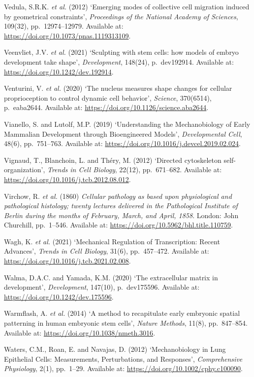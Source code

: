 \documentclass[
]{article}
\begin{document}
Vedula, S.R.K. \emph{et al.} (2012) `Emerging modes of collective cell
migration induced by geometrical constraints', \emph{Proceedings of the
National Academy of Sciences}, 109(32), pp.~12974--12979. Available at:
\url{https://doi.org/10.1073/pnas.1119313109}.

Veenvliet, J.V. \emph{et al.} (2021) `Sculpting with stem cells: how
models of embryo development take shape', \emph{Development}, 148(24),
p.~dev192914. Available at: \url{https://doi.org/10.1242/dev.192914}.

Venturini, V. \emph{et al.} (2020) `The nucleus measures shape changes
for cellular proprioception to control dynamic cell behavior',
\emph{Science}, 370(6514), p.~eaba2644. Available at:
\url{https://doi.org/10.1126/science.aba2644}.

Vianello, S. and Lutolf, M.P. (2019) `Understanding the Mechanobiology
of Early Mammalian Development through Bioengineered Models',
\emph{Developmental Cell}, 48(6), pp.~751--763. Available at:
\url{https://doi.org/10.1016/j.devcel.2019.02.024}.

Vignaud, T., Blanchoin, L. and Théry, M. (2012) `Directed cytoskeleton
self-organization', \emph{Trends in Cell Biology}, 22(12), pp.~671--682.
Available at: \url{https://doi.org/10.1016/j.tcb.2012.08.012}.

Virchow, R. \emph{et al.} (1860) \emph{Cellular pathology as based upon
physiological and pathological histology; twenty lectures delivered in
the Pathological Institute of Berlin during the months of February,
March, and April, 1858}. London: John Churchill, pp.~1--546. Available
at: \url{https://doi.org/10.5962/bhl.title.110759}.

Wagh, K. \emph{et al.} (2021) `Mechanical Regulation of Transcription:
Recent Advances', \emph{Trends in Cell Biology}, 31(6), pp.~457--472.
Available at: \url{https://doi.org/10.1016/j.tcb.2021.02.008}.

Walma, D.A.C. and Yamada, K.M. (2020) `The extracellular matrix in
development', \emph{Development}, 147(10), p.~dev175596. Available at:
\url{https://doi.org/10.1242/dev.175596}.

Warmflash, A. \emph{et al.} (2014) `A method to recapitulate early
embryonic spatial patterning in human embryonic stem cells',
\emph{Nature Methods}, 11(8), pp.~847--854. Available at:
\url{https://doi.org/10.1038/nmeth.3016}.

Waters, C.M., Roan, E. and Navajas, D. (2012) `Mechanobiology in Lung
Epithelial Cells: Measurements, Perturbations, and Responses',
\emph{Comprehensive Physiology}, 2(1), pp.~1--29. Available at:
\url{https://doi.org/10.1002/cphy.c100090}.
\end{document}
